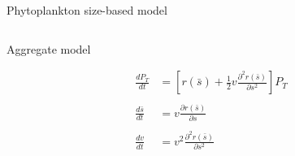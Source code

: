 \documentclass{beamer}
\begin{document}
\begin{frame}{Phytoplankton size-based model}
{\begin{columns}[t]
\begin{column}{0.5\linewidth}

\begin{block} {Aggregate model}

\begin{align*}
\frac{dP_{T}}{dt} & = \left[r(\bar{s})+\frac{1}{2}v\frac{\partial^{2} r(\bar{s})}{\partial s^{2}}\right]P_{T} \nonumber \\
& \nonumber \\[-10pt]
\frac{d\bar{s}}{dt} & = v\frac{\partial r(\bar{s})}{\partial s}\nonumber \\
&\nonumber \\[-10pt]
\frac{dv}{dt} & = v^{2}\frac{\partial^{2} r(\bar{s})}{\partial s^{2}}\nonumber\\
\end{align*}

\end{block}

\end{column}

\end{columns}


}


\end{frame}
\end{document}
